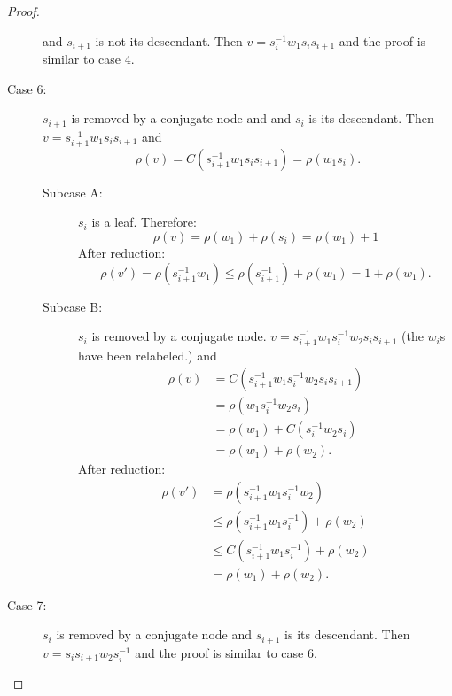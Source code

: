 \documentclass[12pt]{thesis}
\begin{document}
\begin{proof}
\begin{description}
           and $s_{i+1}$ is not its descendant.
           Then $v = s_{i}^{-1} w_{1} s_{i} s_{i+1}$ and
           the proof is similar to case 4.
     \item [Case 6:]
       $s_{i+1}$ is removed by a conjugate
        node and
        and $s_{i}$ is its descendant.
        Then $v = s_{i+1}^{-1} w_{1} s_{i} s_{i+1}$
        and 
        \[
            \rho(v) = C(s_{i+1}^{-1} w_{1} s_{i} s_{i+1}) = \rho(w_{1} s_{i}).
        \]
        \begin{description}
            \item[Subcase A:]
                 $s_{i}$ is a leaf.
                 Therefore:
                    \[
                        \rho(v) = \rho(w_{1}) + \rho(s_{i})
                               = \rho(w_{1}) + 1
                    \]
                    After reduction:
                    \[
                        \rho(v') = \rho(s_{i+1}^{-1}w_{1})
                               \leq \rho(s_{i+1}^{-1}) + \rho(w_{1})
                              = 1 + \rho(w_{1}).
                    \]
             \item[Subcase B:]
             $s_{i}$ is removed by a conjugate node.
                $v = s_{i+1}^{-1} w_{1} s_{i}^{-1} w_{2} s_{i} s_{i+1}$ (the $w_{i}$s have been relabeled.)
                and
                \[
                 \begin{split}
                     \rho(v) &= C(s_{i+1}^{-1} w_{1} s_{i}^{-1} w_{2} s_{i} s_{i+1})  \\
                     &= \rho(w_{1} s_{i}^{-1} w_{2} s_{i})  \\
                     &= \rho(w_{1}) + C(s_{i}^{-1} w_{2} s_{i}) \\
                     &= \rho(w_{1}) + \rho(w_{2}).
                 \end{split}
                \]
                After reduction:
                \[
                \begin{split}
                    \rho(v') &= \rho(s_{i + 1}^{-1} w_{1} s_{i}^{-1}w_{2}) \\
                    &\leq  \rho(s_{i + 1}^{-1} w_{1} s_{i}^{-1}) + \rho(w_{2}) \\
                    &\leq C(s_{i + 1}^{-1} w_{1} s_{i}^{-1}) + \rho(w_{2}) \\
                    &= \rho(w_{1}) + \rho(w_{2}).
                \end{split}
                \]
            \end{description}
     \item [Case 7:]
         $s_{i}$ is removed by a conjugate node and
         $s_{i+1}$ is its descendant.
         Then $v = s_{i}s_{i+1} w_{2} s_{i}^{-1}$
         and the proof is similar to  case 6. \qedhere
\end{description}
\end{proof}
\end{document}
